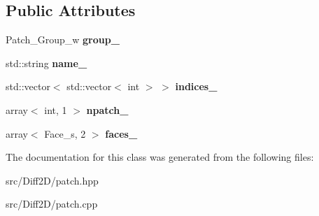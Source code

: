\subsection*{Public Attributes}
\begin{DoxyCompactItemize}
\item 
\hypertarget{classPatch_a93fff2891647c4109c16cb4ec2079545}{
Patch\_\-Group\_\-w {\bfseries group\_\-}}
\label{classPatch_a93fff2891647c4109c16cb4ec2079545}

\item 
\hypertarget{classPatch_a133d268d88897aef8b20ca7da98b9cdb}{
std::string {\bfseries name\_\-}}
\label{classPatch_a133d268d88897aef8b20ca7da98b9cdb}

\item 
\hypertarget{classPatch_a9cf37e5da9a803692c4ad575ec3ffbb1}{
std::vector$<$ std::vector$<$ int $>$ $>$ {\bfseries indices\_\-}}
\label{classPatch_a9cf37e5da9a803692c4ad575ec3ffbb1}

\item 
\hypertarget{classPatch_a41ac7ad621e3c8c93014e96050985990}{
array$<$ int, 1 $>$ {\bfseries npatch\_\-}}
\label{classPatch_a41ac7ad621e3c8c93014e96050985990}

\item 
\hypertarget{classPatch_a6d0bbabb9b7b1928bda12255b312fedd}{
array$<$ Face\_\-s, 2 $>$ {\bfseries faces\_\-}}
\label{classPatch_a6d0bbabb9b7b1928bda12255b312fedd}

\end{DoxyCompactItemize}


The documentation for this class was generated from the following files:\begin{DoxyCompactItemize}
\item 
src/Diff2D/patch.hpp\item 
src/Diff2D/patch.cpp\end{DoxyCompactItemize}
